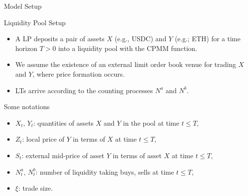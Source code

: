 \documentclass[10pt]{beamer}
\begin{document}
\begin{frame}{Model Setup}

\begin{block}{Liquidity Pool Setup}\pause
\begin{itemize}
	\item A LP deposits a pair of assets $X$ (e.g., USDC) and $Y$ (e.g.; ETH) for a time horizon $T > 0$ into a liquidity pool with the CPMM function.\\ \pause
	\item We assume the existence of an external limit order book venue for trading $X$ and $Y$, where price formation occurs.\pause
	\item LTs arrive according to the counting processes $N^a$ and $N^b$.\pause
\end{itemize}
\end{block}

\begin{block}{Some notations}\pause
   \begin{itemize}
        \item $X_t$, $Y_t$: quantities of assets $X$ and $Y$ in the pool at time $t \leq T$, \pause
        \item $Z_t$: local price of $Y$ in terms of $X$ at time $t \leq T$, \pause
        \item $S_t$: external mid-price of asset $Y$ in terms of asset $X$ at time $t \leq T$,\pause
        \item $N_t^a$, $N_t^b$: number of liquidity taking buys, sells at time $t \leq T$,\pause
        \item $\xi$: trade size.
    \end{itemize}
\end{block}
\end{frame}
\end{document}
